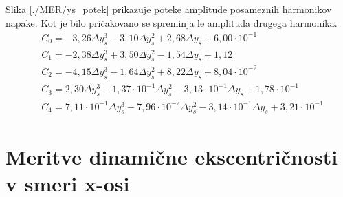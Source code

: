 Slika \ref{./MER/ys_potek} prikazuje poteke amplitude posameznih harmonikov napake. Kot je bilo pričakovano se spreminja le amplituda drugega harmonika. 
\begin{eqnarray}
&C_0 =-3,26\Delta y_s^{3}-3,10\Delta y_s^{2}+2,68\Delta y_s+6,00\cdot 10^{-1} \\                                      
&C_1 =-2,38\Delta y_s^{3}+3,50\Delta y_s^{2}-1,54\Delta y_s+1,12 \\                                                   
&C_2 =-4,15\Delta y_s^{3}-1,64\Delta y_s^{2}+8,22\Delta y_s+8,04\cdot 10^{-2} \\                                      
&C_3 =2,30\Delta y_s^{3}-1,37\cdot 10^{-1}\Delta y_s^{2}-3,13\cdot 10^{-1}\Delta y_s+1,78\cdot 10^{-1} \\             
&C_4 =7,11\cdot 10^{-1}\Delta y_s^{3}-7,96\cdot 10^{-2}\Delta y_s^{2}-3,14\cdot 10^{-1}\Delta y_s+3,21\cdot 10^{-1}
\end{eqnarray}
\section{Meritve dinamične ekscentričnosti v smeri x-osi}

